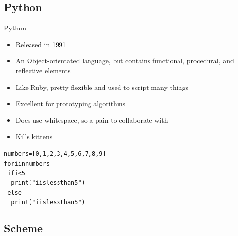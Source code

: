 \documentclass[10pt]{beamer}
\begin{document}
\subsection{Python}

\begin{frame}{Python}

	\begin{itemize}
		\item Released in 1991
		\item An Object-orientated language, but contains functional, procedural, and reflective elements
		\item Like Ruby, pretty flexible and used to script many things
		\item Excellent for prototyping algorithms 
		\item Does use whitespace, so a pain to collaborate with
		\item Kills kittens
	\end{itemize}
	
	\begin{alltt}
	numbers = [0,1,2,3,4,5,6,7,8,9] \\
	for i in numbers \\
		~if i<5         \\
			~~ print("i is less than 5") \\
		~else                                      \\
			~~ print("i is less than 5") \\
	\end{alltt}

\end{frame}


\subsection{Scheme}
\end{document}
